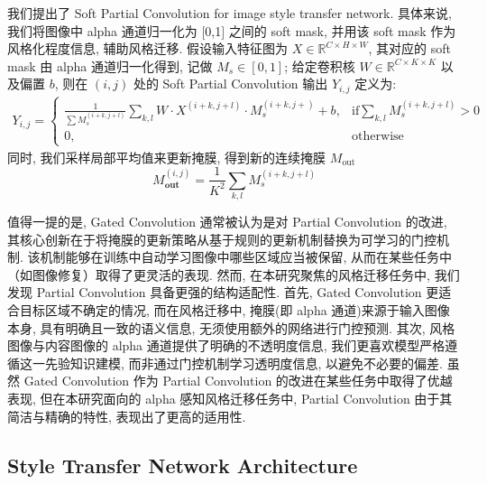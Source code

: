 我们提出了 Soft Partial Convolution for image style transfer network. 具体来说, 我们将图像中 alpha 通道归一化为 $[$0,1$]$ 之间的 soft mask, 并用该 soft mask 作为风格化程度信息, 辅助风格迁移. 假设输入特征图为 $X \in \mathbb{R}^{C\times H \times W}$, 其对应的 soft mask 由 alpha 通道归一化得到, 记做 $M_{s}\in [\mathrm{0},\mathrm{1}]$; 给定卷积核 $W \in \mathbb{R}^{C\times K \times K}$ 以及偏置 $b$, 则在 $(i,j)$ 处的 Soft Partial Convolution 输出 $Y_{i,j}$ 定义为:
\begin{equation}
    \begin{aligned}
        \label{equation-soft_partial_convolution}
        Y_{i,j} = \begin{cases}
            \frac{1}{\sum M_s^{(i+k,j+l)}} \sum_{k,l} W \cdot X^{(i+k, j+l)} \cdot M_{s}^{(i+k, j+)} + b,& \mathrm{if} \sum_{k,l} M_{s}^{(i+k, j+l)} > 0 \\
            0, & \mathrm{otherwise}
        \end{cases}
    \end{aligned}
\end{equation}
同时, 我们采样局部平均值来更新掩膜, 得到新的连续掩膜 $M_{\mathrm{out}}$
\begin{equation}
    \label{equation-mask_update}
    M_{\mathbf{out}}^{(i,j)} = \frac{1}{K^2}\sum_{k,l} M_{s}^{(i+k, j+l)} 
\end{equation}

值得一提的是, Gated Convolution\cite{yu2019free} 通常被认为是对 Partial Convolution 的改进, 其核心创新在于将掩膜的更新策略从基于规则的更新机制替换为可学习的门控机制. 该机制能够在训练中自动学习图像中哪些区域应当被保留, 从而在某些任务中（如图像修复）取得了更灵活的表现. 然而, 在本研究聚焦的风格迁移任务中, 我们发现 Partial Convolution 具备更强的结构适配性. 首先, Gated Convolution 更适合目标区域不确定的情况, 而在风格迁移中, 掩膜(即 alpha 通道)来源于输入图像本身, 具有明确且一致的语义信息, 无须使用额外的网络进行门控预测. 其次, 风格图像与内容图像的 alpha 通道提供了明确的不透明度信息, 我们更喜欢模型严格遵循这一先验知识建模, 而非通过门控机制学习透明度信息, 以避免不必要的偏差. 虽然 Gated Convolution 作为 Partial Convolution 的改进在某些任务中取得了优越表现, 但在本研究面向的 alpha 感知风格迁移任务中,  Partial Convolution 由于其简洁与精确的特性, 表现出了更高的适用性.

\subsection{Style Transfer Network Architecture}

